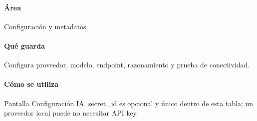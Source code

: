 \paragraph{Área} Configuración y metadatos

\paragraph{Qué guarda} Configura proveedor, modelo, endpoint, razonamiento y prueba de conectividad.

\paragraph{Cómo se utiliza} Pantalla Configuración IA. secret\_\allowbreak{}id es opcional y único dentro de esta tabla; un proveedor local puede no necesitar API key.


